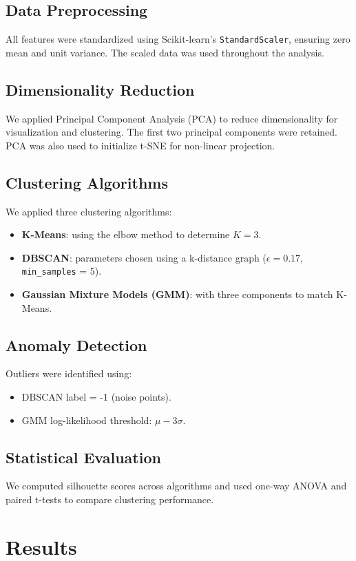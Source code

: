 \documentclass[12pt]{article}
\begin{document}
\subsection*{Data Preprocessing}
All features were standardized using Scikit-learn’s \texttt{StandardScaler}, ensuring zero mean and unit variance. The scaled data was used throughout the analysis.

\subsection*{Dimensionality Reduction}
We applied Principal Component Analysis (PCA) to reduce dimensionality for visualization and clustering. The first two principal components were retained. PCA was also used to initialize t-SNE for non-linear projection.

\subsection*{Clustering Algorithms}
We applied three clustering algorithms:
\begin{itemize}
    \item \textbf{K-Means}: using the elbow method to determine $K=3$.
    \item \textbf{DBSCAN}: parameters chosen using a k-distance graph ($\epsilon = 0.17$, \texttt{min\_samples} = 5).
    \item \textbf{Gaussian Mixture Models (GMM)}: with three components to match K-Means.
\end{itemize}

\subsection*{Anomaly Detection}
Outliers were identified using:
\begin{itemize}
    \item DBSCAN label = -1 (noise points).
    \item GMM log-likelihood threshold: $\mu - 3\sigma$.
\end{itemize}

\subsection*{Statistical Evaluation}
We computed silhouette scores across algorithms and used one-way ANOVA and paired t-tests to compare clustering performance.

\section{Results}
\end{document}
